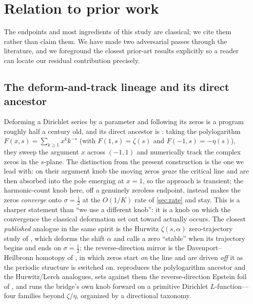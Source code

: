 \documentclass[11pt]{article}
\theoremstyle{definition}
\begin{document}
\section{Relation to prior work}\label{sec:prior}

The endpoints and most ingredients of this study are classical; we cite them
rather than claim them. We have made two adversarial passes through the
literature, and we foreground the closest prior-art results explicitly so a
reader can locate our residual contribution precisely.

\subsection{The deform-and-track lineage and its direct ancestor}
\label{sec:lineage}
Deforming a Dirichlet series by a parameter and following its zeros is a program
roughly half a century old, and its direct ancestor is \citet{FornbergKolbig1975}:
taking the polylogarithm $F(x,s)=\sum_{k\ge1}x^k k^{-s}$ (with $F(1,s)=\zeta(s)$
and $F(-1,s)=-\eta(s)$), they sweep the argument $x$ across $(-1,1)$ and
numerically track the complex zeros in the $s$-plane. The distinction from the
present construction is the one we lead with: on their argument knob the moving
zeros \emph{graze} the critical line and are then absorbed into the pole emerging
at $x=1$, so the approach is transient; the harmonic-count knob here, off a
genuinely zeroless endpoint, instead makes the zeros \emph{converge} onto
$\sigma=\tfrac12$ at the $O(1/K)$ rate of \cref{sec:rate} and stay. This is a
sharper statement than ``we use a different knob'': it is a knob on which the
convergence the classical deformation set out toward actually occurs. The closest
\emph{published} analogue in the same spirit is the Hurwitz $\zeta(s,\alpha)$
zero-trajectory study of \citet{GarunkstisSteuding2007}, which deforms the shift
$\alpha$ and calls a zero ``stable'' when its trajectory begins and ends on
$\sigma=\tfrac12$; the reverse-direction mirror is the Davenport--Heilbronn
homotopy of \citet{BalanzarioSanchezOrtiz2007}, in which zeros start \emph{on} the
line and are driven \emph{off} it as the periodic structure is switched on.
 reproduces the polylogarithm ancestor and the Hurwitz/Lerch
analogues, sets against them the reverse-direction Epstein foil of
\citet{TravenecSamaj2022}, and runs the bridge's own knob forward on a primitive
Dirichlet $L$-function---four families beyond $\zeta/\eta$, organized by a directional
taxonomy.
\end{document}

